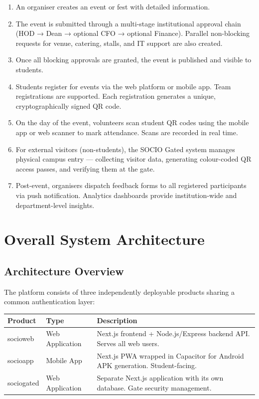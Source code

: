 \documentclass[12pt,a4paper]{article}
\begin{document}
\begin{enumerate}[leftmargin=*]
    \item An organiser creates an event or fest with detailed information.
    \item The event is submitted through a multi-stage institutional approval chain (HOD → Dean → optional CFO → optional Finance). Parallel non-blocking requests for venue, catering, stalls, and IT support are also created.
    \item Once all blocking approvals are granted, the event is published and visible to students.
    \item Students register for events via the web platform or mobile app. Team registrations are supported. Each registration generates a unique, cryptographically signed QR code.
    \item On the day of the event, volunteers scan student QR codes using the mobile app or web scanner to mark attendance. Scans are recorded in real time.
    \item For external visitors (non-students), the SOCIO Gated system manages physical campus entry — collecting visitor data, generating colour-coded QR access passes, and verifying them at the gate.
    \item Post-event, organisers dispatch feedback forms to all registered participants via push notification. Analytics dashboards provide institution-wide and department-level insights.
\end{enumerate}

\newpage
\section{Overall System Architecture}

\subsection{Architecture Overview}

The platform consists of three independently deployable products sharing a common authentication layer:

\begin{tabularx}{\textwidth}{L{3cm} L{3cm} X}
\toprule
{}
\textbf{Product} & \textbf{Type} & \textbf{Description} \\
\midrule
socioweb & Web Application & Next.js frontend + Node.js/Express backend API. Serves all web users. \\
socioapp & Mobile App & Next.js PWA wrapped in Capacitor for Android APK generation. Student-facing. \\
sociogated & Web Application & Separate Next.js application with its own database. Gate security management. \\
\bottomrule
\end{tabularx}
\end{document}
